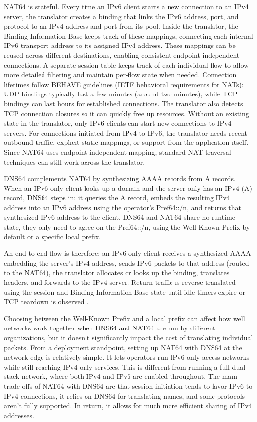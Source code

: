 NAT64 is stateful. Every time an IPv6 client starts a new connection to an IPv4 server, the translator creates a binding that links the IPv6 address, port, and protocol to an IPv4 address and port from its pool. Inside the translator, the Binding Information Base keeps track of these mappings, connecting each internal IPv6 transport address to its assigned IPv4 address. These mappings can be reused across different destinations, enabling consistent  endpoint-independent connections. A separate session table keeps track of each individual flow to allow more detailed filtering and maintain per-flow state when needed. 
Connection lifetimes follow BEHAVE guidelines (IETF behavioral requirements for NATs): UDP bindings typically last a few minutes (around two minutes), while TCP bindings can last hours for established connections. The translator also detects TCP connection closures so it can quickly free up resources. Without an existing state in the translator, only IPv6 clients can start new connections to IPv4 servers. For connections initiated from IPv4 to IPv6, the translator needs recent outbound traffic, explicit static mappings, or support from the application itself. 
Since NAT64 uses endpoint-independent mapping, standard NAT traversal techniques can still work across the translator\cite{6231295,rfc6146}.

DNS64 complements NAT64 by synthesizing AAAA records from A records. When an IPv6-only client looks up a domain and the server only has an IPv4 (A) record, DNS64 steps in: it queries the A record, embeds the resulting IPv4 address into an IPv6 address using the operator’s Pref64::/n, and returns that synthesized IPv6 address to the client\cite{rfc6147}. DNS64 and NAT64 share no runtime state, they only need to agree on the Pref64::/n, using the Well-Known Prefix by default or a specific local prefix\cite{6231295}. 

An end-to-end flow is therefore: an IPv6-only client receives a synthesized AAAA embedding the server’s IPv4 address, sends IPv6 packets to that address (routed to the NAT64), the translator allocates or looks up the binding, translates headers, and forwards to the IPv4 server. Return traffic is reverse-translated using the session and Binding Information Base state until idle timers expire or TCP teardown is observed \cite{6231295,rfc6147}.

Choosing between the Well-Known Prefix and a local prefix can affect how well networks work together when DNS64 and NAT64 are run by different organizations, but it doesn't significantly impact the cost of translating individual packets\cite{6231295}. From a deployment standpoint, setting up NAT64 with DNS64 at the network edge is relatively simple. It lets operators run IPv6-only access networks while still reaching IPv4-only services. This is different from running a full dual-stack network, where both IPv4 and IPv6 are enabled throughout. The main trade-offs of NAT64 with DNS64 are that session initiation tends to favor IPv6 to IPv4 connections, it relies on DNS64 for translating names, and some protocols aren’t fully supported. In return, it allows for much more efficient sharing of IPv4 addresses\cite{rfc6146}.


